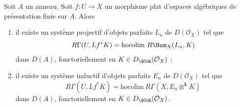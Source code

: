 \begin{lemma}
\label{lemma-computing-sections-as-colim}
Soit $A$ un anneau. Soit $f:U\to X$ un morphisme plat d'espaces alg\'ebriques
de pr\'esentation finie sur $A$. Alors
\begin{enumerate}
\item il existe un syst\`eme projectif d'objets parfaits $L_n$ de
$D(\mathcal{O}_X)$ tel que
$$
R\Gamma(U, Lf^*K) = \text{hocolim}\ R\Hom_X(L_n, K)
$$
dans $D(A)$, fonctoriellement en $K\in D_\QCoh(\mathcal{O}_X)$ ;
\item il existe un syst\`eme inductif d'objets parfaits $E_n$ de
$D(\mathcal{O}_X)$ tel que
$$
R\Gamma(U, Lf^*K) = \text{hocolim}\ R\Gamma(X, E_n \otimes^\mathbf{L} K)
$$
dans $D(A)$, fonctoriellement en $K\in D_\QCoh(\mathcal{O}_X)$.
\end{enumerate}
\end{lemma}

